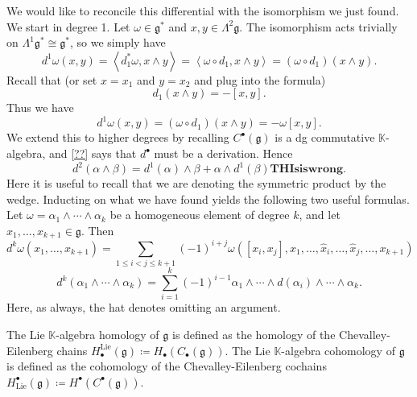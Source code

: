 \begin{discussion}
	We would like to reconcile this differential with the isomorphism we just found. We start in degree 1. Let $\omega \in \mathfrak{g} ^*$ and $x,y\in \Lambda ^2\mathfrak{g} $. The isomorphism acts trivially on $\Lambda ^1\mathfrak{g}^*\cong \mathfrak{g}^* $, so we simply have
	\[
		d^1\omega (x,y)=\left\langle d_1^*\omega ,x\wedge y \right\rangle =\left\langle \omega \circ d_1,x\wedge y \right\rangle =(\omega \circ d_1)(x\wedge y)
	.\]
	Recall that (or set $x=x_1$ and $y=x_2$ and plug into the formula)
	\[
		d_1(x\wedge y)=-[x,y]
	.\]
	Thus we have
	\[
		d^1\omega (x,y)=(\omega \circ d_1)(x\wedge y)=-\omega [x,y]
	.\]
	We extend this to higher degrees by recalling $C^{\bullet} (\mathfrak{g} )$ is a dg commutative $\mathbb{K} $-algebra, and \cref{??} says that $d^{\bullet} $ must be a derivation. Hence
	\[
		d^2(\alpha \wedge \beta )=d^1(\alpha )\wedge \beta +\alpha \wedge d^1(\beta )\mathbf{THIsiswrong} 
	.\]
	Here it is useful to recall that we are denoting the symmetric product by the wedge. Inducting on what we have found yields the following two useful formulas. Let $\omega =\alpha _1 \wedge \cdots \wedge \alpha _k$ be a homogeneous element of degree $k$, and let $x_1, \ldots ,x_{k+1}\in \mathfrak{g} $. Then
	\[
		d^k\omega (x_1, \ldots ,x_{k+1})=\sum_{1\leq i<j\leq k+1} (-1)^{i+j} \omega ([x_i,x_j],x_1, \ldots ,\widehat{x}_i, \ldots ,\widehat{x}_j, \ldots ,x_{k+1} )
	\]
	\[
		d^k(\alpha _1 \wedge \cdots \wedge \alpha _k)=\sum_{i=1}^{k} (-1)^{i-1} \alpha _1 \wedge \cdots \wedge d(\alpha _i)\wedge \cdots \wedge \alpha _k
	.\]
	Here, as always, the hat denotes omitting an argument.
\end{discussion}

\begin{definition}\label{3.1.4}
	The Lie $\mathbb{K} $-algebra homology of $\mathfrak{g} $ is defined as the homology of the Chevalley-Eilenberg chains $H_{\bullet} ^{\mathrm{Lie} } (\mathfrak{g})\coloneqq  H_{\bullet} (C_{\bullet} (\mathfrak{g} ))$. The Lie $\mathbb{K} $-algebra cohomology of $\mathfrak{g} $ is defined as the cohomology of the Chevalley-Eilenberg cochains $H^{\bullet} _{\mathrm{Lie} } (\mathfrak{g} )\coloneqq H^{\bullet} (C^{\bullet} (\mathfrak{g} ))$.
\end{definition}

